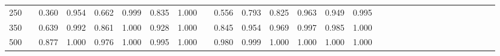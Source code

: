 % 
\begin{tabular}{ccccccccccccccccccccccccccccc}
  \hline
  \hline
250 &  & 0.360 & 0.954 & 0.662 & 0.999 & 0.835 & 1.000 &  & 0.556 & 0.793 & 0.825 & 0.963 & 0.949 & 0.995 &  &  &  &  &  &  &  &  &  &  &  &  &  &  \\ 
  350 &  & 0.639 & 0.992 & 0.861 & 1.000 & 0.928 & 1.000 &  & 0.845 & 0.954 & 0.969 & 0.997 & 0.985 & 1.000 &  &  &  &  &  &  &  &  &  &  &  &  &  &  \\ 
  500 &  & 0.877 & 1.000 & 0.976 & 1.000 & 0.995 & 1.000 &  & 0.980 & 0.999 & 1.000 & 1.000 & 1.000 & 1.000 &  &  &  &  &  &  &  &  &  &  &  &  &  &  \\ 
   \hline
\end{tabular}
